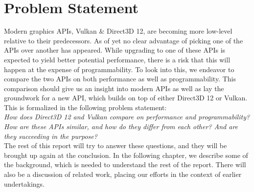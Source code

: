 \section{Problem Statement}\label{sec:problem_statement}
Modern graphics \glspl{API}, Vulkan \& Direct3D 12, are becoming more low-level relative to their predecessors. 
As of yet no clear advantage of picking one of the \glspl{API} over another has appeared.
While upgrading to one of these \glspl{API} is expected to yield better potential performance, there is a risk that this will happen at the expense of programmability. 
To look into this, we endeavor to compare the two \glspl{API} on both performance as well as programmability. 
This comparison should give us an insight into modern \glspl{API} as well as lay the groundwork for a new API, which builds on top of either Direct3D 12 or Vulkan. 
This is formalized in the following problem statement:
\\ 
\textit{How does Direct3D 12 and Vulkan compare on performance and programmability? How are these \glspl{API} similar, and how do they differ from each other?  And are they succeeding in the purpose?}
\\ 
The rest of this report will try to answer these questions, and they will be brought up again at the conclusion. 
In the following chapter, we describe some of the background, which is needed to understand the rest of the report.
There will also be a discussion of related work, placing our efforts in the context of earlier undertakings.


